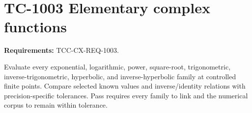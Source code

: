\documentclass{article}
\begin{document}
\section*{TC-1003 Elementary complex functions}
\textbf{Requirements:} TCC-CX-REQ-1003.

Evaluate every exponential, logarithmic, power, square-root, trigonometric,
inverse-trigonometric, hyperbolic, and inverse-hyperbolic family at controlled
finite points. Compare selected known values and inverse/identity relations
with precision-specific tolerances. Pass requires every family to link and
the numerical corpus to remain within tolerance.
\end{document}
